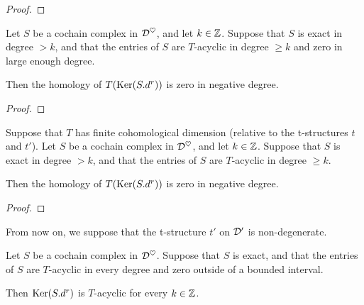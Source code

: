 \begin{proof}
\leanok
\end{proof}


\begin{lemma}
\label{prop-leftAcyclic_ker_of_bounded_complex}
\leanok 
{}
Let $S$ be a cochain complex in $\mathcal{D}^\heartsuit$, and let $k\in\mathbb{Z}$. 
Suppose that $S$ is exact in degree $> k$, and that
the entries of $S$ are $T$-acyclic in degree $\ge k$ and zero in large enough degree.

Then the homology of $T(\operatorname{Ker} (S.d^r))$ is zero in negative degree.

\end{lemma}

\begin{proof}
\leanok
\end{proof}


\begin{lemma}
\label{prop-leftAcyclic_ker_of_bounded_functor}
\leanok 
{}
Suppose that $T$ has finite cohomological dimension (relative to the t-structures $t$ and $t'$).
Let $S$ be a cochain complex in $\mathcal{D}^\heartsuit$, and let $k\in\mathbb{Z}$. 
Suppose that $S$ is exact in degree $> k$, and that
the entries of $S$ are $T$-acyclic in degree $\ge k$.

Then the homology of $T(\operatorname{Ker} (S.d^r))$ is zero in negative degree.

\end{lemma}

\begin{proof}
\leanok
\end{proof}


From now on, we suppose that the t-structure $t'$ on $\mathcal{D}'$ is non-degenerate.

\begin{lemma}
\label{prop-acyclic_ker_of_bounded_exact_acyclic_complex}
\leanok 
{}
Let $S$ be a cochain complex in $\mathcal{D}^\heartsuit$.
Suppose that $S$ is exact, and that
the entries of $S$ are $T$-acyclic in every degree and zero outside of a bounded interval.

Then $\operatorname{Ker} (S.d^r)$ is $T$-acyclic for every $k\in\mathbb{Z}$.

\end{lemma}

